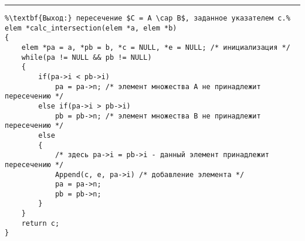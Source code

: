 \documentclass{article}
\begin{document}
\vspace{5pt} \hrule
\begin{lstlisting}[caption={Вычисление пересечения слиянием}, label=p_45, escapechar=\%]
%\noindent\textbf{Вход:} пересекаемые множества A и B, заданные указателями a и b.\\%
%\textbf{Выход:} пересечение $C = A \cap B$, заданное указателем c.%
elem *calc_intersection(elem *a, elem *b)
{
	elem *pa = a, *pb = b, *c = NULL, *e = NULL; /* инициализация */
	while(pa != NULL && pb != NULL)
	{
		if(pa->i < pb->i)
			pa = pa->n; /* элемент множества A не принадлежит пересечению */
		else if(pa->i > pb->i)
			pb = pb->n; /* элемент множества B не принадлежит пересечению */
		else
		{
			/* здесь pa->i = pb->i - данный элемент принадлежит пересечению */
			Append(c, e, pa->i) /* добавление элемента */
			pa = pa->n;
			pb = pb->n;
		}
	}
	return c;
}
\end{lstlisting}
\end{document}
